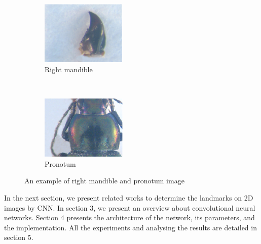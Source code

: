 \documentclass[conference]{IEEEtran}
\begin{document}
\begin{figure}[htbp]
    \centering
    \begin{subfigure}[t]{0.25\textwidth}
        \centering
        \includegraphics[height=1.2in]{images/md19.eps}
        \caption{Right mandible}
        \label{figsub01}
    \end{subfigure}%
    ~ 
    \begin{subfigure}[t]{0.25\textwidth}
        \centering
        \includegraphics[height=1.2in]{images/prono60.eps}
        \caption{Pronotum }
        \label{figsub02}
    \end{subfigure}
    \caption{An example of right mandible and pronotum image}
    \label{figsub012}
\end{figure}

In the next section, we present related works to determine the landmarks on 2D images by CNN. In section 3, we present an overview about convolutional neural networks. Section 4 presents the architecture of the network, its parameters, and the implementation. All the experiments and analysing the results are detailed in section 5.
\end{document}
